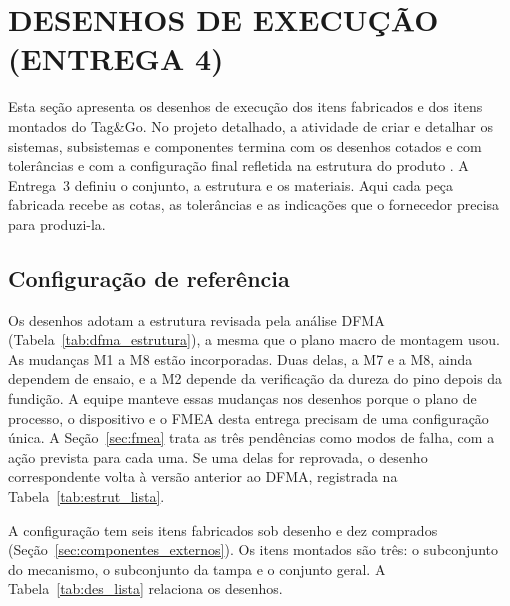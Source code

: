 \section{DESENHOS DE EXECUÇÃO (ENTREGA 4)}\label{sec:desenhos_execucao}


Esta seção apresenta os desenhos de execução dos itens fabricados e dos itens montados do Tag\&Go. No projeto detalhado, a atividade de criar e detalhar os sistemas, subsistemas e componentes termina com os desenhos cotados e com tolerâncias e com a configuração final refletida na estrutura do produto \cite{rozenfeld2006gestao}. A Entrega~3 definiu o conjunto, a estrutura e os materiais. Aqui cada peça fabricada recebe as cotas, as tolerâncias e as indicações que o fornecedor precisa para produzi-la.

\subsection{Configuração de referência}
\label{subsec:des_config}

Os desenhos adotam a estrutura revisada pela análise DFMA (Tabela~\ref{tab:dfma_estrutura}), a mesma que o plano macro de montagem usou. As mudanças M1 a M8 estão incorporadas. Duas delas, a M7 e a M8, ainda dependem de ensaio, e a M2 depende da verificação da dureza do pino depois da fundição. A equipe manteve essas mudanças nos desenhos porque o plano de processo, o dispositivo e o FMEA desta entrega precisam de uma configuração única. A Seção~\ref{sec:fmea} trata as três pendências como modos de falha, com a ação prevista para cada uma. Se uma delas for reprovada, o desenho correspondente volta à versão anterior ao DFMA, registrada na Tabela~\ref{tab:estrut_lista}.

A configuração tem seis itens fabricados sob desenho e dez comprados (Seção~\ref{sec:componentes_externos}). Os itens montados são três: o subconjunto do mecanismo, o subconjunto da tampa e o conjunto geral. A Tabela~\ref{tab:des_lista} relaciona os desenhos.

